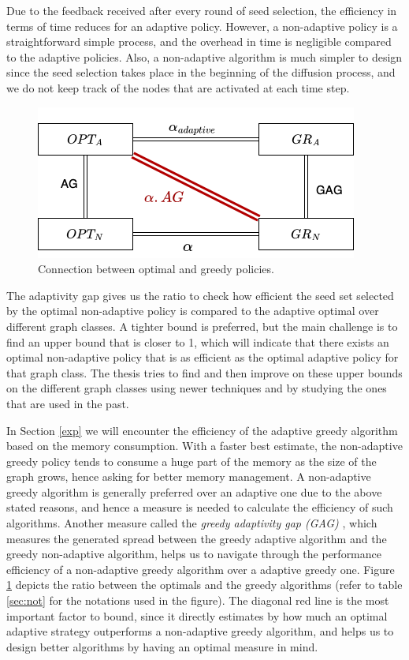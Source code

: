 Due to the feedback received after every round of seed selection, the efficiency in terms of time reduces for an adaptive policy. However, a non-adaptive policy is a straightforward simple process, and the overhead in time is negligible compared to the adaptive policies. 
Also, a non-adaptive algorithm is much simpler to design since the seed selection takes place in the beginning of the diffusion process, and we do not keep track of the nodes that are activated at each time step. 

 
\begin{figure}
\centering
    \includegraphics[width=0.7\linewidth]{GSSI_thesisProposal/figures/AG.png}
    \caption{Connection between optimal and greedy policies.}
\label{fig:ag}
\end{figure}

The adaptivity gap gives us the ratio to check how efficient the seed set selected by the optimal non-adaptive policy is compared to the adaptive optimal over different graph classes. A tighter bound is preferred, but the main challenge is to find an upper bound that is closer to 1, which will indicate that there exists an optimal non-adaptive policy that is as efficient as the optimal adaptive policy for that graph class. 
The thesis tries to find and then improve on these upper bounds on the different graph classes using newer techniques and by studying the ones that are used in the past. 

In Section \ref{exp} we will encounter the efficiency of the adaptive greedy algorithm based on the memory consumption. With a faster best estimate, the non-adaptive greedy policy tends to consume a huge part of the memory as the size of the graph grows, hence asking for better memory management. A non-adaptive greedy algorithm is generally preferred over an adaptive one due to the above stated reasons, and hence a measure is needed to calculate the efficiency of such algorithms. Another measure called the \emph{greedy adaptivity gap (GAG)} \cite{Chen2019a}, which measures the generated spread  between the greedy adaptive algorithm and the greedy non-adaptive algorithm, helps us to navigate through the performance efficiency of a non-adaptive greedy algorithm over a adaptive greedy one. Figure \ref{fig:ag} depicts the ratio between the optimals and the greedy algorithms (refer to table \ref{sec:not} for the notations used in the figure). The diagonal red line is the most important factor to bound, since it directly estimates by how much an optimal adaptive strategy outperforms a non-adaptive greedy algorithm, and helps us to design better algorithms by having an optimal measure in mind. 


